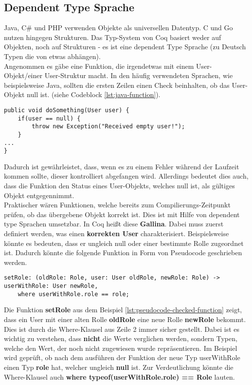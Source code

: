 \subsection{Dependent Type Sprache}
Java, C\# und PHP verwenden Objekte als universellen Datentyp. C und Go nutzen hingegen Strukturen. Das Typ-System von Coq basiert weder auf Objekten, noch auf Strukturen - es ist eine dependent Type Sprache (zu Deutsch Typen die von etwas abhängen).\\
Angenommen es gäbe eine Funktion, die irgendetwas mit einem User-Objekt/einer User-Struktur macht. In den häufig verwendeten Sprachen, wie beispielsweise Java, sollten die ersten Zeilen einen Check beinhalten, ob das User-Objekt null ist. (siehe Codeblock \ref{lst:java-function}).
\begin{lstlisting}[language=coq,firstnumber=1,caption=Java Funktion für den initialen Check auf null des User Objektes,label=lst:java-function]
public void doSomething(User user) {
	if(user == null) {
		throw new Exception("Received empty user!");
	}
...
}
\end{lstlisting}
Dadurch ist gewährleistet, dass, wenn es zu einem Fehler während der Laufzeit kommen sollte, dieser kontrolliert abgefangen wird. Allerdings bedeutet dies auch, dass die Funktion den Status eines User-Objekts, welches null ist, als gültiges Objekt entgegennimmt.\\
Praktischer wären Funktionen, welche bereits zum Compilierungs-Zeitpunkt prüfen, ob das übergebene Objekt korrekt ist.
Dies ist mit Hilfe von dependent type Sprachen umsetzbar. In Coq heißt diese \textbf{Gallina}. Dabei muss zuerst definiert werden, was einen \textbf{korrekten User} charakterisiert. Beispielsweise könnte es bedeuten, dass er ungleich null oder einer bestimmte Rolle zugeordnet ist. Dadurch könnte die folgende Funktion in Form von Pseudocode geschrieben werden.
\begin{lstlisting}[language=coq,firstnumber=1,caption=Pseudocode Check auf null des User Objektes,label=lst:pseudocode-checked-function]
setRole: (oldRole: Role, user: User oldRole, newRole: Role) -> userWithRole: User newRole,
	where userWithRole.role == role;
\end{lstlisting}
Die Funktion \textbf{setRole} aus dem Beispiel \ref{lst:pseudocode-checked-function} zeigt, dass ein User mit einer alten Rolle \textbf{oldRole} eine neue Rolle \textbf{newRole} bekommt. Dies ist durch die Where-Klausel aus Zeile 2 immer sicher gestellt. Dabei ist es wichtig zu verstehen, dass \textbf{nicht} die Werte verglichen werden, sondern Typen, welche den Wert, der noch nicht zugewiesen wurde repräsentieren. Im Beispiel wird geprüft, ob nach dem ausführen der Funktion der neue Typ userWithRole einen Typ \textbf{role} hat, welcher ungleich \textbf{null} ist. Zur Verdeutlichung könnte die Where-Klausel auch \textbf{where typeof(userWithRole.role) == Role} lauten.\\
